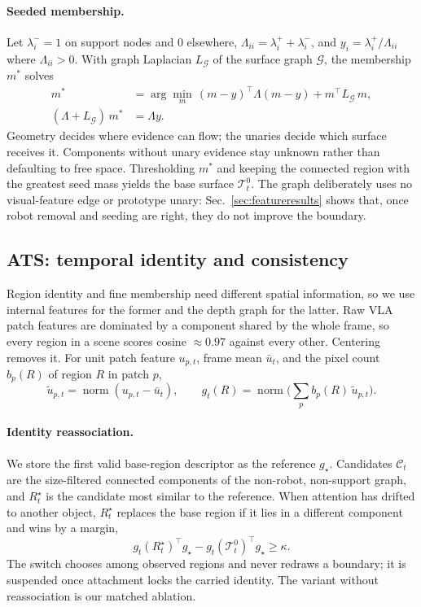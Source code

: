 \paragraph{Seeded membership.}
Let $\lambda_i^-=1$ on support nodes and $0$ elsewhere, $\Lambda_{ii}=\lambda_i^++\lambda_i^-$, and $y_i=\lambda_i^+/\Lambda_{ii}$ where $\Lambda_{ii}>0$. With graph Laplacian $L_{\mathcal G}$ of the surface graph $\mathcal G$, the membership $m^*$ solves
\begin{equation}
\begin{split}
 m^*&=\arg\min_m\,(m-y)^\top\Lambda(m-y)+m^\top L_{\mathcal G}\,m,\\
 (\Lambda+L_{\mathcal G})\,m^*&=\Lambda y .
\end{split}
 \label{eq:energy}
\end{equation}
Geometry decides where evidence can flow; the unaries decide which surface receives it. Components without unary evidence stay unknown rather than defaulting to free space. Thresholding $m^*$ and keeping the connected region with the greatest seed mass yields the base surface $\mathcal T_t^0$. The graph deliberately uses no visual-feature edge or prototype unary: Sec.~\ref{sec:featureresults} shows that, once robot removal and seeding are right, they do not improve the boundary.

\subsection{ATS: temporal identity and consistency}
\label{sec:memory}
Region identity and fine membership need different spatial information, so we use internal features for the former and the depth graph for the latter. Raw VLA patch features are dominated by a component shared by the whole frame, so every region in a scene scores cosine $\approx0.97$ against every other. Centering removes it. For unit patch feature $u_{p,t}$, frame mean $\bar u_t$, and the pixel count $b_p(R)$ of region $R$ in patch $p$,
\begin{equation}
 \widetilde u_{p,t}=\operatorname{norm}(u_{p,t}-\bar u_t),\qquad
 g_t(R)=\operatorname{norm}\!\Big(\sum_p b_p(R)\,\widetilde u_{p,t}\Big).
 \label{eq:descriptor}
\end{equation}

\paragraph{Identity reassociation.}
We store the first valid base-region descriptor as the reference $g_\star$. Candidates $\mathcal C_t$ are the size-filtered connected components of the non-robot, non-support graph, and $R_t^\star$ is the candidate most similar to the reference. When attention has drifted to another object, $R_t^\star$ replaces the base region if it lies in a different component and wins by a margin,
\begin{equation}
 g_t(R_t^\star)^\top g_\star-g_t(\mathcal T_t^0)^\top g_\star\geq\kappa .
 \label{eq:switch}
\end{equation}
The switch chooses among observed regions and never redraws a boundary; it is suspended once attachment locks the carried identity. The variant without reassociation is our matched ablation.

